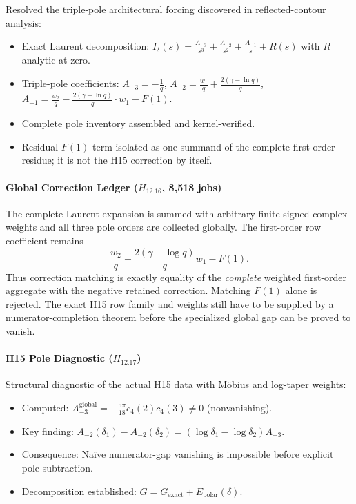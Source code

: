 \documentclass[11pt,a4paper]{article}
\theoremstyle{plain}
\theoremstyle{definition}
\theoremstyle{remark}
\begin{document}
Resolved the triple-pole architectural forcing discovered in reflected-contour analysis:
\begin{itemize}[leftmargin=2em]
  \item Exact Laurent decomposition: $I_\delta(s) = \frac{A_{-3}}{s^3} + \frac{A_{-2}}{s^2} + \frac{A_{-1}}{s} + R(s)$ with $R$ analytic at zero.
  \item Triple-pole coefficients: $A_{-3} = -\frac{1}{q}$, $A_{-2} = \frac{w_1}{q} + \frac{2(\gamma-\ln q)}{q}$, $A_{-1} = \frac{w_2}{q} - \frac{2(\gamma-\ln q)}{q} \cdot w_1 - F(1)$.
  \item Complete pole inventory assembled and kernel-verified.
  \item Residual $F(1)$ term isolated as one summand of the complete first-order residue; it is not the H15 correction by itself.
\end{itemize}

\paragraph{Global Correction Ledger ($H_{12.16}$, 8,518 jobs)}

The complete Laurent expansion is summed with arbitrary finite signed complex
weights and all three pole orders are collected globally.  The first-order
row coefficient remains
\[
  \frac{w_2}{q}-\frac{2(\gamma-\log q)}{q}w_1-F(1).
\]
Thus correction matching is exactly equality of the \emph{complete} weighted
first-order aggregate with the negative retained correction.  Matching
$F(1)$ alone is rejected.  The exact H15 row family and weights still have to
be supplied by a numerator-completion theorem before the specialized global
gap can be proved to vanish.

\paragraph{H15 Pole Diagnostic ($H_{12.17}$)}

Structural diagnostic of the actual H15 data with Möbius and log-taper weights:
\begin{itemize}[leftmargin=2em]
  \item Computed: $A_{-3}^{\text{global}} = -\frac{5\pi}{18} c_4(2)c_4(3) \ne 0$ (nonvanishing).
  \item Key finding: $A_{-2}(\delta_1) - A_{-2}(\delta_2) = (\log \delta_1 - \log \delta_2) A_{-3}$.
  \item Consequence: Naïve numerator-gap vanishing is impossible before explicit pole subtraction.
  \item Decomposition established: $G = G_{\text{exact}} + E_{\text{polar}}(\delta)$.
\end{itemize}
\end{document}

